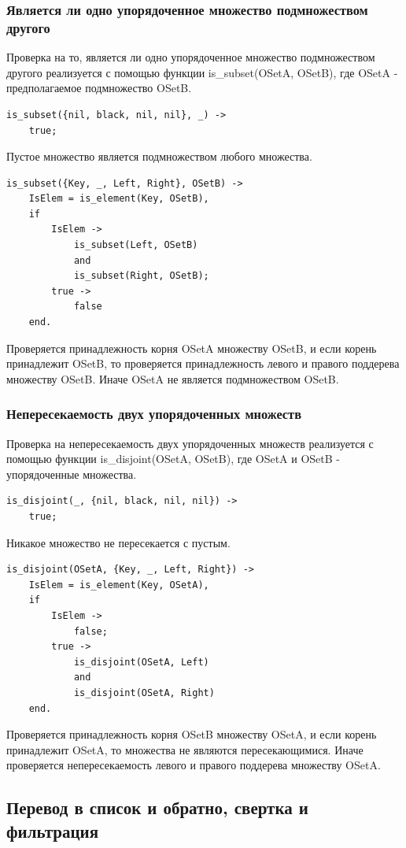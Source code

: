		\subsubsection{Является ли одно упорядоченное множество подмножеством другого}
			Проверка на то, является ли одно упорядоченное множество подмножеством другого
			реализуется с помощью функции is\_subset(OSetA, OSetB), где OSetA - предполагаемое
			подмножество OSetB.
			\begin{lstlisting}
is_subset({nil, black, nil, nil}, _) ->
    true;	
			\end{lstlisting}
			Пустое множество является подмножеством любого множества.	
			\begin{lstlisting}
is_subset({Key, _, Left, Right}, OSetB) ->
    IsElem = is_element(Key, OSetB),
    if
        IsElem -> 
            is_subset(Left, OSetB) 
            and 
            is_subset(Right, OSetB);
        true -> 
            false
    end.
			\end{lstlisting}
			Проверяется принадлежность корня OSetA множеству OSetB, и если корень
			принадлежит OSetB, то проверяется принадлежность левого и правого поддерева
			множеству OSetB. Иначе OSetA не является подмножеством OSetB.
			
		\subsubsection{Непересекаемость двух упорядоченных множеств}
			Проверка на непересекаемость двух упорядоченных множеств реализуется с помощью функции
			is\_disjoint(OSetA, OSetB), где OSetA и OSetB - упорядоченные множества.
			\begin{lstlisting}
is_disjoint(_, {nil, black, nil, nil}) ->
    true;	
			\end{lstlisting}
			Никакое множество не пересекается с пустым.
			\begin{lstlisting}
is_disjoint(OSetA, {Key, _, Left, Right}) ->
    IsElem = is_element(Key, OSetA),
    if
        IsElem -> 
            false;
        true -> 
            is_disjoint(OSetA, Left) 
            and 
            is_disjoint(OSetA, Right)
	end.
			\end{lstlisting}
			Проверяется принадлежность корня OSetB множеству OSetA, и если корень
			принадлежит OSetA, то множества не являются пересекающимися. Иначе
			проверяется непересекаемость левого и правого поддерева множеству OSetA.
		
		
	\subsection{Перевод в список и обратно, свертка и фильтрация}
